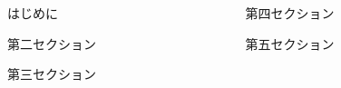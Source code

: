 \begin{frame}[t]{}
    
    \vspace{10mm}
    \begin{columns}[T]
      \begin{column}{.49\linewidth}
        \begin{block}{はじめに}
          
        \end{block}
        \begin{block}{第二セクション}
        \end{block}
        \begin{block}{第三セクション}
        \end{block}
        \end{column}
        \begin{column}{.49\linewidth}
        \begin{block}{第四セクション}
        \end{block}
        \begin{block}{第五セクション}
        \end{block}
      \end{column}
    \end{columns}
    \end{frame}